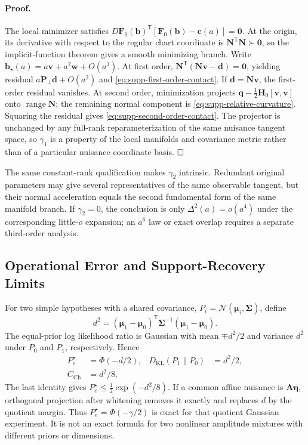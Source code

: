\paragraph{Proof.}
The local minimizer satisfies
$D\bm F_0(\bm b)^{\mathsf T}[\bm F_0(\bm b)-\bm c(a)]=\bm0$.
At the origin, its derivative with respect to the regular chart coordinate is
$\bm N^{\mathsf T}\bm N\succ\bm0$, so the implicit-function theorem gives a smooth minimizing branch. Write
$\bm b_{\star}(a)=a\bm v+a^2\bm w+O(a^3)$.
At first order, $\bm N^{\mathsf T}(\bm N\bm v-\bm d)=\bm0$, yielding residual $a\bm P_{\perp}\bm d+O(a^2)$ and \eqref{eq:supp-first-order-contact}. If $\bm d=\bm N\bm v$, the first-order residual vanishes. At second order, minimization projects
$\bm q-\tfrac12\bm H_0[\bm v,\bm v]$ onto $\operatorname{range}\bm N$; the remaining normal component is \eqref{eq:supp-relative-curvature}. Squaring the residual gives \eqref{eq:supp-second-order-contact}. The projector is unchanged by any full-rank reparameterization of the same nuisance tangent space, so $\gamma_1$ is a property of the local manifolds and covariance metric rather than of a particular nuisance coordinate basis. $\hfill\square$

The same constant-rank qualification makes $\gamma_2$ intrinsic. Redundant
original parameters may give several representatives of the same observable
tangent, but their normal acceleration equals the second fundamental form of the
same manifold branch. If $\gamma_2=0$, the conclusion is only
$\Delta^2(a)=o(a^4)$ under the corresponding little-$o$ expansion; an $a^6$ law
or exact overlap requires a separate third-order analysis.

\subsection{Operational Error and Support-Recovery Limits}

For two simple hypotheses with a shared covariance,
$P_i=\mathcal N(\bm\mu_i,\bm\Sigma)$, define
\begin{equation}
 d^2=(\bm\mu_1-\bm\mu_0)^{\mathsf T}\bm\Sigma^{-1}
 (\bm\mu_1-\bm\mu_0).
 \label{eq:supp-simple-mahalanobis}
\end{equation}
The equal-prior log likelihood ratio is Gaussian with mean
$\mp d^2/2$ and variance $d^2$ under $P_0$ and $P_1$, respectively. Hence
\begin{equation}
 \begin{aligned}
 P_e^\star&=\Phi(-d/2),&
 D_{\mathrm{KL}}(P_1\|P_0)&=d^2/2,\\
 C_{\mathrm{Ch}}&=d^2/8.&&
 \end{aligned}
 \label{eq:supp-gaussian-operational-map}
\end{equation}
The last identity gives
$P_e^\star\le\tfrac12\exp(-d^2/8)$. If a common affine nuisance is
$\bm A\bm\eta$, orthogonal projection after whitening removes it exactly and
replaces $d$ by the quotient margin. Thus
$P_e^\star=\Phi(-\gamma/2)$ is exact for that quotient Gaussian experiment.
It is not an exact formula for two nonlinear amplitude mixtures with different
priors or dimensions.


